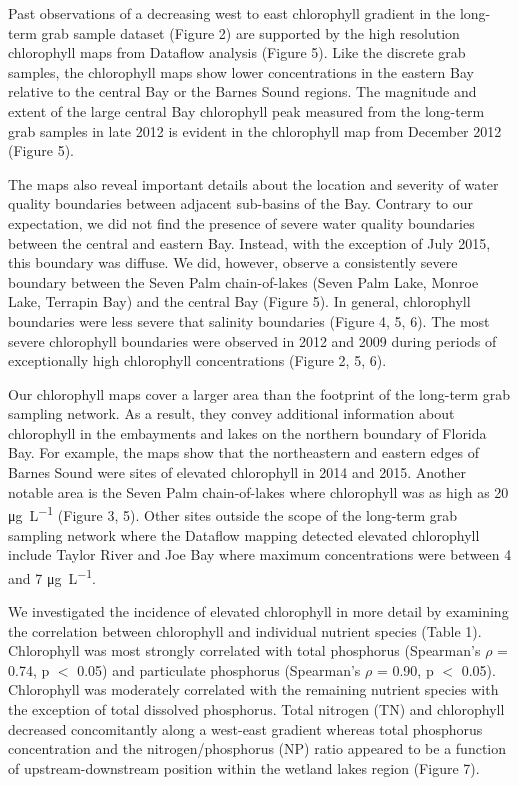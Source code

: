 Past observations of a decreasing west to east chlorophyll gradient in the long-term grab sample dataset (Figure 2) are supported by the high resolution chlorophyll maps from Dataflow analysis (Figure 5). Like the discrete grab samples, the chlorophyll maps show lower concentrations in the eastern Bay relative to the central Bay or the Barnes Sound regions. The magnitude and extent of the large central Bay chlorophyll peak measured from the long-term grab samples in late 2012 is evident in the chlorophyll map from December 2012 (Figure 5). 

The maps also reveal important details about the location and severity of water quality boundaries between adjacent sub-basins of the Bay. Contrary to our expectation, we did not find the presence of severe water quality boundaries between the central and eastern Bay. Instead, with the exception of July 2015, this boundary was diffuse. We did, however, observe a consistently severe boundary between the Seven Palm chain-of-lakes (Seven Palm Lake, Monroe Lake, Terrapin Bay) and the central Bay (Figure 5). In general, chlorophyll boundaries were less severe that salinity boundaries (Figure 4, 5, 6). The most severe chlorophyll boundaries were observed in 2012 and 2009 during periods of exceptionally high chlorophyll concentrations (Figure 2, 5, 6). 

Our chlorophyll maps cover a larger area than the footprint of the long-term grab sampling network. As a result, they convey additional information about chlorophyll in the embayments and lakes on the northern boundary of Florida Bay. For example, the maps show that the northeastern and eastern edges of Barnes Sound were sites of elevated chlorophyll in 2014 and 2015. Another notable area is the Seven Palm chain-of-lakes where chlorophyll was as high as 20 \si{\micro\gram\per\liter} (Figure 3, 5). Other sites outside the scope of the long-term grab sampling network where the Dataflow mapping detected elevated chlorophyll include Taylor River and Joe Bay where maximum concentrations were between 4 and 7 \si{\micro\gram\per\liter}. 

We investigated the incidence of elevated chlorophyll in more detail by examining the correlation between chlorophyll and individual nutrient species (Table 1). Chlorophyll was most strongly correlated with total phosphorus (Spearman's $\rho$ = 0.74, p $<$ 0.05) and particulate phosphorus (Spearman's $\rho$ = 0.90, p $<$ 0.05). Chlorophyll was moderately correlated with the remaining nutrient species with the exception of total dissolved phosphorus. Total nitrogen (TN) and chlorophyll decreased concomitantly along a west-east gradient whereas total phosphorus concentration and the nitrogen/phosphorus (NP) ratio appeared to be a function of upstream-downstream position within the wetland lakes region (Figure 7).  

